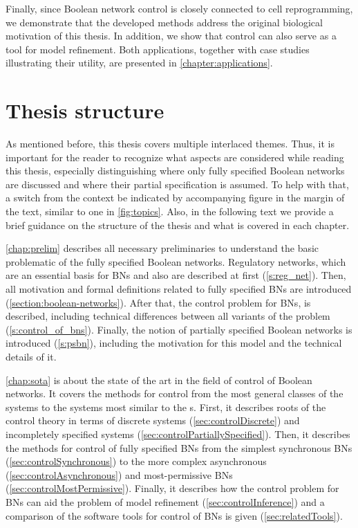 \medskip

\noindent{}\hspace{3pt}
Finally, since Boolean network control is closely connected to cell reprogramming, we demonstrate that the developed methods address the original biological motivation of this thesis. In addition, we show that control can also serve as a tool for model refinement. Both applications, together with case studies illustrating their utility, are presented in \autoref{chapter:applications}.

\section{Thesis structure}

As mentioned before, this thesis covers multiple interlaced themes. Thus, it is important for the reader to recognize what aspects are considered while reading this thesis, especially distinguishing where only fully specified Boolean networks are discussed and where their partial specification is assumed. To help with that, a switch from the context be indicated by accompanying figure in the margin of the text, similar to one in \autoref{fig:topics}. Also, in the following text we provide a brief guidance on the structure of the thesis and what is covered in each chapter.

\autoref{chap:prelim} describes all necessary preliminaries to understand the basic problematic of the fully specified Boolean networks. Regulatory networks, which are an essential basis for BNs and also  are described at first (\autoref{s:reg_net}). Then, all motivation and formal definitions related to fully specified BNs are introduced (\autoref{section:boolean-networks}). After that, the control problem for BNs, is described, including technical differences between all variants of the problem (\autoref{s:control_of_bns}). Finally, the notion of partially specified Boolean networks is introduced (\autoref{s:psbn}), including the motivation for this model and the technical details of it.

\autoref{chap:sota} is about the state of the art in the field of control of Boolean networks. It covers the methods for control from the most general classes of the systems to the systems most similar to the \PBN{}s. First, it describes roots of the control theory in terms of discrete systems (\autoref{sec:controlDiscrete}) and incompletely specified systems (\autoref{sec:controlPartiallySpecified}). Then, it describes the methods for control of fully specified BNs from the simplest synchronous BNs (\autoref{sec:controlSynchronous}) to the more complex asynchronous (\autoref{sec:controlAsynchronous}) and most-permissive BNs (\autoref{sec:controlMostPermissive}). Finally, it describes how the control problem for BNs can aid the problem of model refinement (\autoref{sec:controlInference}) and a comparison of the software tools for control of BNs is given (\autoref{sec:relatedTools}).

